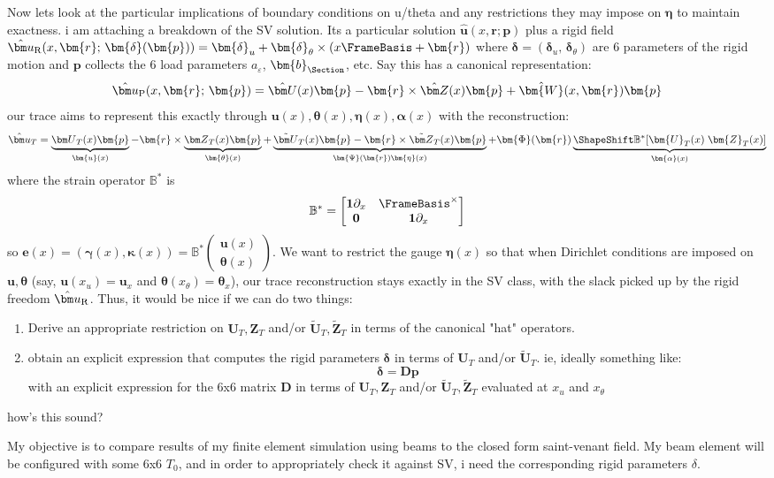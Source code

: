 \begin{Prompt}
Now lets look at the particular implications of boundary conditions on u/theta and any restrictions they may impose on $\bm\eta$ to maintain exactness. 
i am attaching a breakdown of the SV solution. 
Its a particular solution $\hat{\bm u}(x,\bm{r}; \bm{p})$ plus a rigid field $\hat{\bm u}_{\rm R}(x,\bm{r};\, \bm{\delta}(\bm{p})) = \bm{\delta}_u + \bm{\delta}_{\theta}\times (x\FrameBasis + \bm{r})$ where $\bm{\delta} = (\bm{\delta}_u,\,\bm{\delta}_{\theta})$ are 6 parameters of the rigid motion and \(\bm{p}\) collects the 6 load parameters $a_\varepsilon$, $\bm{b}_{\Section}$, etc. 
Say this has a canonical representation:
$$
\hat{\bm u}_{\rm P}(x,\bm{r};\, \bm{p}) = \hat{\bm U}(x)\bm{p} - \bm{r}\times\hat{\bm Z}(x)\bm{p} + \hat{\bm{W}}(x,\bm{r})\bm{p}
$$
our trace aims to represent this exactly through \(\bm{u}(x),\bm{\theta}(x),\bm{\eta}(x),\bm{\alpha}(x)\) with the reconstruction:
 $$
\hat{\bm u}_T 
= \underbrace{{\bm U}_T(x)\bm{p}}_{\bm{u}(x)} - \bm{r}\times\underbrace{{\bm Z}_T(x)\bm{p}}_{\bm{\theta}(x)} 
+ \underbrace{\tilde{\bm U}_T(x)\bm{p} - \bm{r}\times\tilde{\bm Z}_T(x)\bm{p}}_{\bm{\Psi}(\bm{r})\bm{\eta}(x)}
+ \bm{\Phi}(\bm{r})\underbrace{\ShapeShift\mathbb{B}^*[\bm{U}_T(x)\; \bm{Z}_T(x)]}_{\bm{\alpha}(x)}
 $$
 where the strain operator \(\mathbb{B}^*\) is
 \[
\mathbb{B}^* = \begin{bmatrix}
    \mathbf{1}\partial_x & \FrameBasis^{\times}  \\
    \mathbf{0} & \mathbf{1} \partial_x 
\end{bmatrix}
\]
so \(\bm{e}(x) = (\bm{\gamma}(x),\bm{\kappa}(x)) = \mathbb{B}^*\begin{pmatrix}\bm{u}(x) \\ \bm{\theta}(x)\end{pmatrix}\).
We want to restrict the gauge \(\bm{\eta}(x)\) so that when Dirichlet conditions are imposed on \(\bm{u},\bm{\theta}\) (say, $\bm{u}(x_u) = \bm{u}_x$ and $\bm{\theta}(x_{\theta}) = \bm{\theta}_{x}$), our trace reconstruction stays exactly in the SV class, with the slack picked up by the rigid freedom \(\hat{\bm u}_{\rm R}\). 
Thus, it would be nice if we can do two things:
\begin{enumerate}
    \item Derive an appropriate restriction on \(\bm{U}_T,\bm{Z}_T\) and/or \(\tilde{\bm U}_{T},\tilde{\bm Z}_T\) in terms of the canonical "hat" operators.
    \item obtain an explicit expression that computes the rigid parameters $\bm{\delta}$ in terms of \(\bm{U}_T\) and/or \(\tilde{\bm U}_{T}\). ie, ideally something like:
    $$
    \bm{\delta} = \mathbf{D}\bm{p}
    $$
    with an explicit expression for the 6x6 matrix $\mathbf{D}$ in terms of \(\bm{U}_T,\bm{Z}_T\) and/or \(\tilde{\bm U}_{T},\tilde{\bm Z}_T\) evaluated at \(x_u\) and \(x_{\theta}\)
\end{enumerate}
how's this sound?

My objective is to compare results of my finite element simulation using beams to the closed form saint-venant field. 
My beam element will be configured with some 6x6 $T_0$, and in order to appropriately check it against SV, i need the corresponding rigid parameters $\delta$.
\end{Prompt}